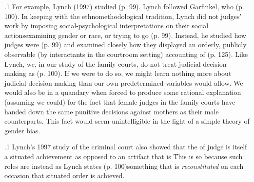 \documentclass[11pt, twoside]{article}
\begin{document}
{\p.1{%
For example, Lynch (1997) studied 
(p. 99). Lynch followed Garfinkel, who  (p. 100).
In keeping with the ethnomethodological tradition, Lynch did not
 judges’ work by imposing social-psychological interpretations on their social actions\mdash{}examining gender or race, or trying to go
 (p. 99). Instead, he studied how judges were  (p. 99) and examined closely
how they displayed an orderly, publicly observable (by interactants in
the courtroom setting) accounting of  (p. 125).
Like Lynch, we, in our study of the family courts, do not treat judicial decision making as  (p. 100). If we were to do so, we might
learn nothing more about judicial decision making than our own predetermined variables would allow. We would also be in a quandary when
forced to produce some rational explanation (assuming we could) for
the fact that female judges in the family courts have handed down the
same punitive decisions against mothers as their male counterparts. This
fact would seem unintelligible in the light of a simple theory of gender
bias.
}%

\p.1{%
Lynch’s 1997 study of the criminal court also showed that the 
of judge is itself a situated achievement as opposed to an artifact that is
 This is so because such
roles are instead as Lynch states  (p. 100)\mdash{}something that is \textit{reconstituted} on
each occasion that situated order is achieved.
}%

}
\end{document}
